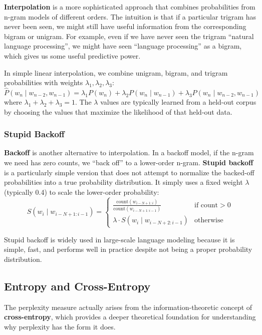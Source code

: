 \documentclass[11pt,a4paper]{article}
\begin{document}
\textbf{Interpolation} is a more sophisticated approach that combines probabilities from n-gram models of different orders. The intuition is that if a particular trigram has never been seen, we might still have useful information from the corresponding bigram or unigram. For example, even if we have never seen the trigram ``natural language processing'', we might have seen ``language processing'' as a bigram, which gives us some useful predictive power.

In simple linear interpolation, we combine unigram, bigram, and trigram probabilities with weights $\lambda_1, \lambda_2, \lambda_3$:
\[
\hat{P}(w_n \mid w_{n-2}, w_{n-1}) = \lambda_1 P(w_n) + \lambda_2 P(w_n \mid w_{n-1}) + \lambda_3 P(w_n \mid w_{n-2}, w_{n-1})
\]
where $\lambda_1 + \lambda_2 + \lambda_3 = 1$. The $\lambda$ values are typically learned from a held-out corpus by choosing the values that maximize the likelihood of that held-out data.

\subsubsection{Stupid Backoff}

\textbf{Backoff} is another alternative to interpolation. In a backoff model, if the n-gram we need has zero counts, we ``back off'' to a lower-order n-gram. \textbf{Stupid backoff} is a particularly simple version that does not attempt to normalize the backed-off probabilities into a true probability distribution. It simply uses a fixed weight $\lambda$ (typically 0.4) to scale the lower-order probability:
\[
S(w_i \mid w_{i-N+1:i-1}) =
\begin{cases}
\frac{\text{count}(w_{i-N+1:i})}{\text{count}(w_{i-N+1:i-1})} & \text{if count} > 0 \\
\lambda \cdot S(w_i \mid w_{i-N+2:i-1}) & \text{otherwise}
\end{cases}
\]

Stupid backoff is widely used in large-scale language modeling because it is simple, fast, and performs well in practice despite not being a proper probability distribution.

\subsection{Entropy and Cross-Entropy}

The perplexity measure actually arises from the information-theoretic concept of \textbf{cross-entropy}, which provides a deeper theoretical foundation for understanding why perplexity has the form it does.
\end{document}
